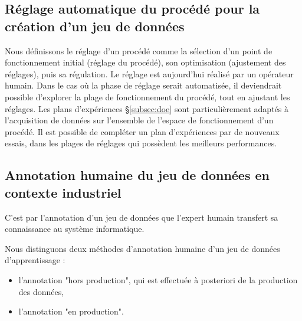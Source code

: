 \subsection{Réglage automatique du procédé pour la création d'un jeu de données} \label{auto_construction}
Nous définissons le réglage d'un procédé comme la sélection d'un point de fonctionnement initial (réglage du procédé), son optimisation (ajustement des réglages), puis sa régulation.
Le réglage est aujourd'hui réalisé par un opérateur humain.
Dans le cas où la phase de réglage serait automatisée, il deviendrait possible d'explorer la plage de fonctionnement du procédé, tout en ajustant les réglages.  %
Les plans d'expériences §\ref{subsec:doe} sont particulièrement adaptés à l'acquisition de données sur l'ensemble de l'espace de fonctionnement d'un procédé.
Il est possible de compléter un plan d'expériences par de nouveaux essais, dans les plages de réglages qui possèdent les meilleurs performances.

\subsection{Annotation humaine du jeu de données en contexte industriel}
C'est par l'annotation d'un jeu de données que l'expert humain transfert sa connaissance au système informatique.

Nous distinguons deux méthodes d'annotation humaine d'un jeu de données d'apprentissage :
\begin{itemize}
	\item l'annotation "hors production", qui est effectuée à posteriori de la production des données,
	\item l'annotation "en production".
\end{itemize}

